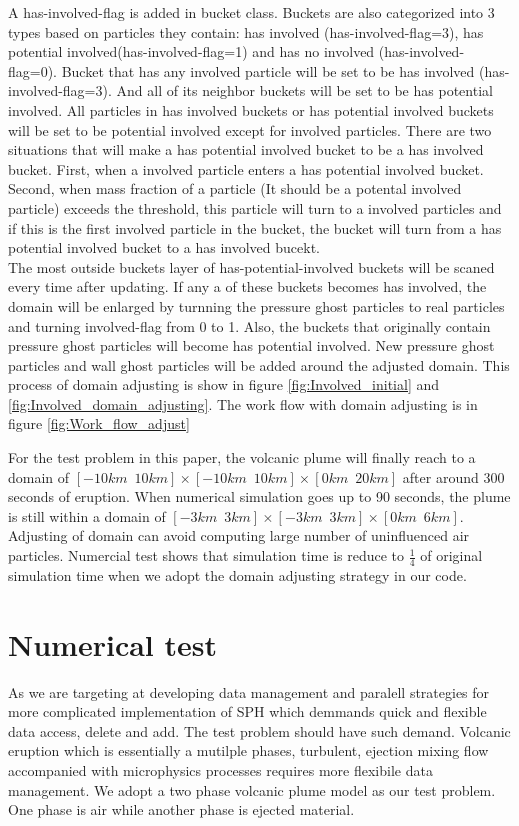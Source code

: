 \documentclass[10pt,a4paper]{article}
\begin{document}
A has-involved-flag is added in bucket class. Buckets are also categorized into 3 types based on particles they contain: has involved (has-involved-flag=3), has potential involved(has-involved-flag=1) and has no involved (has-involved-flag=0). Bucket that has any involved particle will be set to be has involved (has-involved-flag=3). And all of its neighbor buckets will be set to be has potential involved. 
All particles in has involved buckets or has potential involved buckets will be set to be potential involved except for involved particles. There are two situations that will make a has potential involved bucket to be a has involved bucket. First, when a involved particle enters a has potential involved bucket. Second, when mass fraction of a particle (It should be a potental involved particle) exceeds the threshold, this particle will turn to a involved particles and if this is the first involved particle in the bucket, the bucket will turn from a has potential involved bucket to a has involved bucekt.\\
The most outside buckets layer of has-potential-involved buckets will be scaned every time after updating. If any a of these buckets becomes has involved, the domain will be enlarged by turnning the pressure ghost particles to real particles and turning involved-flag from 0 to 1. Also, the buckets that originally contain pressure ghost particles will become has potential involved. New pressure ghost particles and wall ghost particles will be added around the adjusted domain.
This process of domain adjusting is show in figure \ref{fig:Involved_initial} and \ref{fig:Involved_domain_adjusting}.
The work flow with domain adjusting is in figure \ref{fig:Work_flow_adjust} 

For the test problem in this paper, the volcanic plume will finally reach to a domain of $[-10km \,\,\, 10km] \times [-10km\,\,\,10km] \times [0km\,\,\,20km]$ after around 300 seconds of eruption. When numerical simulation goes up to 90 seconds, the plume is still within a domain of $[-3km\,\,\,3km] \times [-3km\,\,\,3km] \times [0km\,\,\,6km]$. Adjusting of domain can avoid computing large number of uninfluenced air particles. Numercial test shows that simulation time is reduce to $\frac{1}{4}$ of original simulation time when we adopt the domain adjusting strategy in our code.
\section{Numerical test}
As we are targeting at developing data management and paralell strategies for more complicated implementation of SPH which demmands quick and flexible data access, delete and add. The test problem should have such demand. Volcanic eruption which is essentially a mutilple phases, turbulent, ejection mixing flow accompanied with microphysics processes requires more flexibile data management. We adopt a two phase volcanic plume model\citep{suzuki2005numerical} as our test problem. One phase is air while another phase is ejected material.
\end{document}
